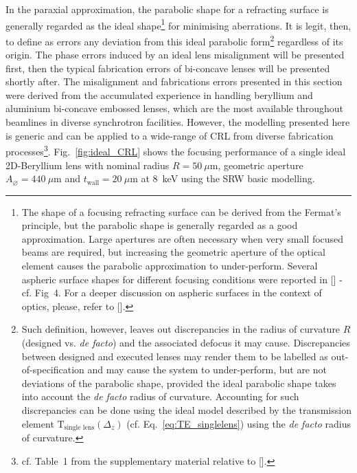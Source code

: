 \begin{refsection}
In the paraxial approximation, the parabolic shape for a refracting surface is generally regarded as the ideal shape\footnote{The shape of a focusing refracting surface can be derived from the Fermat's principle, but the parabolic shape is generally regarded as a good approximation. Large apertures are often necessary when very small focused beams are required, but increasing the geometric aperture of the optical element causes the parabolic approximation to under-perform. Several aspheric surface shapes for different focusing conditions were reported in [\cite{SanchezdelRio2012}] - cf. Fig~4. For a deeper discussion on aspheric surfaces in the context of optics, please, refer to [\cite{Schulz1988}].} for minimising aberrations. It is legit, then, to define as errors any deviation from this ideal parabolic form\footnote{Such definition, however, leaves out discrepancies in the radius of curvature $R$ (designed vs. \textit{de facto}) and the associated defocus it may cause. Discrepancies between designed and executed lenses may render them to be labelled as out-of-specification and may cause the system to under-perform, but are not deviations of the parabolic shape, provided the ideal parabolic shape takes into account the \textit{de facto} radius of curvature. Accounting for such discrepancies can be done using the ideal model described by the transmission element $\mathrm{T}_{\text{single lens}}(\Delta_z)$ (cf. Eq.~\ref{eq:TE_singlelens}) using the \textit{de facto} radius of curvature.} regardless of its origin. The phase errors induced by an ideal lens misalignment will be presented first, then the typical fabrication errors of bi-concave lenses will be presented shortly after. The misalignment and fabrications errors presented in this section were derived from the accumulated experience in handling beryllium and aluminium bi-concave embossed lenses, which are the most available throughout beamlines in diverse synchrotron facilities. However, the modelling presented here is generic and can be applied to a wide-range of CRL from diverse fabrication processes\footnote{cf. Table~1 from the supplementary material relative to [\cite{Roth2017}].}. Fig.~\ref{fig:ideal_CRL} shows the focusing performance of a single ideal 2D-Beryllium lens with nominal radius $R=50~\mu\text{m}$, geometric aperture $A_{\diameter}=440~\mu\text{m}$ and $t_\text{wall}=20~\mu$m at 8~keV using the SRW basic modelling. 


\end{refsection}
